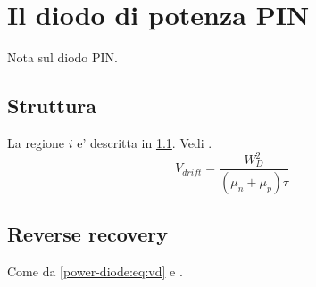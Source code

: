 \chapter{Il diodo di potenza PIN}
\label{ch:power-diode}
\begin{chapabstract}
Nota sul diodo PIN.
\end{chapabstract}
\section{Struttura}
\label{power-diode:sec:struct}
La regione $i$ e' descritta in \ref{power-diode:sec:struct}. Vedi \cite{baliga}.
\begin{equation}\label{power-diode:eq:vd}
V_{drift}=\frac{W_D^2}{(\mu_n+\mu_p)\tau}
\end{equation}
\section{Reverse recovery}
Come da \eqref{power-diode:eq:vd} e \cite{lauritzen1991}.


